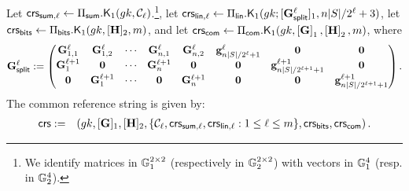 \begin{description}
Let
$\mathsf{crs}_{\mathsf{sum},\ell} \gets \Pi_{\mathsf{sum}}.\mathsf{K}_1({gk}, \mathcal{C}_\ell)$.\footnote{We identify
matrices in $\mathbb{G}_1^{2 \times 2}$ (respectively in $\mathbb{G}_2^{2 \times 2}$) with vectors in $\mathbb{G}_1^{4}$ (resp. in $\mathbb{G}_2^{4}$).}, let $\mathsf{crs}_{\mathsf{lin},\ell}\gets \Pi_\mathsf{lin}.\mathsf{K}_1(gk;[\mathbf{{G}}^\ell_{\mathsf{split}}]_1,n|S|/2^{\ell}+3)$, let $\mathsf{crs}_{\mathsf{bits}}\gets\Pi_{\mathsf{bits}}.\mathsf{K}_1(gk,[\mathbf{{H}}]_2,m)$, and let $\mathsf{crs}_{\mathsf{com}} \gets \Pi_{\mathsf{com}}.\mathsf{K}_1({gk}, \left[\mathbf{{G}}\right]_1,\left[\mathbf{{H}}\right]_2,m)$, where
$$
\mathbf{{G}}_\mathsf{split}^\ell:=
\begin{pmatrix}
\mathbf{{G}}^{\ell}_{1,1} & \mathbf{{G}}^{\ell}_{1,2} & \cdots & \mathbf{{G}}^{\ell}_{n,1} & \mathbf{{G}}^{\ell}_{n,2} & \mathbf{g}^{\ell}_{n|S|/2^{\ell}+1} & \mathbf{{0}}                       & \mathbf{{0}}\\
\mathbf{{G}}^{\ell+1}_{1} & \mathbf{{0}}           & \cdots & \mathbf{{G}}^{\ell+1}_{n} & \mathbf{{0}}           & \mathbf{{0}}                    &\mathbf{g}^{\ell+1}_{n|S|/2^{\ell+1}+1} & \mathbf{{0}}\\
\mathbf{{0}}           & \mathbf{{G}}^{\ell+1}_{1} & \cdots & \mathbf{{0}}           & \mathbf{{G}}^{\ell+1}_{n} & \mathbf{{0}}                    & \mathbf{{0}}                       & \mathbf{g}^{\ell+1}_{n|S|/2^{\ell+1}+1}
\end{pmatrix}.
$$
The common reference string is given by:
\begin{eqnarray*}
\mathsf{crs}&:=&\left( gk, [\mathbf{{G}}]_1,
    [\mathbf{{H}}]_2, \{\mathcal{C}_\ell,\mathsf{crs}_{\mathsf{sum},\ell},\mathsf{crs}_{\mathsf{lin},\ell}:1\leq \ell\leq m\},\mathsf{crs}_{\mathsf{bits}},\mathsf{crs}_{\mathsf{com}} \right).
 \end{eqnarray*}



\end{description}
